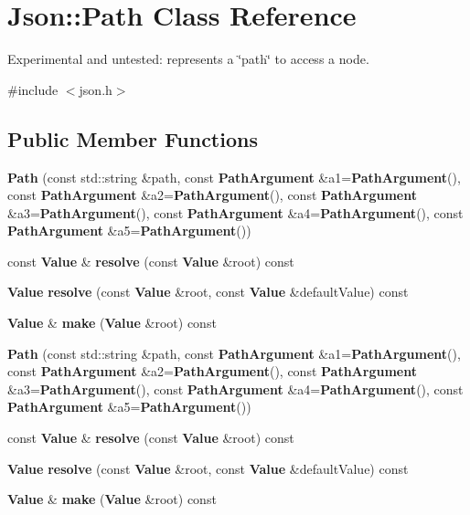 \section{Json\+:\+:Path Class Reference}
\label{class_json_1_1_path}


Experimental and untested\+: represents a \char`\"{}path\char`\"{} to access a node.  




{\ttfamily \#include $<$json.\+h$>$}

\subsection*{Public Member Functions}
\begin{DoxyCompactItemize}
\item 
{\bfseries Path} (const std\+::string \&path, const {\bf Path\+Argument} \&a1={\bf Path\+Argument}(), const {\bf Path\+Argument} \&a2={\bf Path\+Argument}(), const {\bf Path\+Argument} \&a3={\bf Path\+Argument}(), const {\bf Path\+Argument} \&a4={\bf Path\+Argument}(), const {\bf Path\+Argument} \&a5={\bf Path\+Argument}())\label{class_json_1_1_path_aaa37a99650e770d0cd680bf53585ec99}

\item 
const {\bf Value} \& {\bfseries resolve} (const {\bf Value} \&root) const \label{class_json_1_1_path_ae1d05fa985a6ee3c57f2b8ed186b5982}

\item 
{\bf Value} {\bfseries resolve} (const {\bf Value} \&root, const {\bf Value} \&default\+Value) const \label{class_json_1_1_path_a33d1749770a4cf74e9a3de419bc7febe}

\item 
{\bf Value} \& {\bf make} ({\bf Value} \&root) const 
\item 
{\bfseries Path} (const std\+::string \&path, const {\bf Path\+Argument} \&a1={\bf Path\+Argument}(), const {\bf Path\+Argument} \&a2={\bf Path\+Argument}(), const {\bf Path\+Argument} \&a3={\bf Path\+Argument}(), const {\bf Path\+Argument} \&a4={\bf Path\+Argument}(), const {\bf Path\+Argument} \&a5={\bf Path\+Argument}())\label{class_json_1_1_path_aaa37a99650e770d0cd680bf53585ec99}

\item 
const {\bf Value} \& {\bfseries resolve} (const {\bf Value} \&root) const \label{class_json_1_1_path_a781d60b27fdb34f228018e5b1ce16d59}

\item 
{\bf Value} {\bfseries resolve} (const {\bf Value} \&root, const {\bf Value} \&default\+Value) const \label{class_json_1_1_path_a33d1749770a4cf74e9a3de419bc7febe}

\item 
{\bf Value} \& {\bf make} ({\bf Value} \&root) const 
\end{DoxyCompactItemize}


